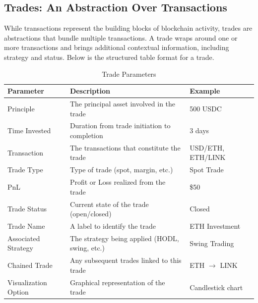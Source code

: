 \documentclass{article}
\begin{document}
\subsection{Trades: An Abstraction Over Transactions}
While transactions represent the building blocks of blockchain activity, trades are abstractions that bundle multiple transactions. A trade wraps around one or more transactions and brings additional contextual information, including strategy and status. Below is the structured table format for a trade.

\begin{table}[h!]
  \centering
  \begin{tabular}{|p{4cm}|p{8cm}|p{4cm}|}
  \hline
  \textbf{Parameter}        & \textbf{Description}                                & \textbf{Example}                     \\
  \hline
  Principle            & The principal asset involved in the trade      & 500 USDC                        \\
  \hline
  Time Invested        & Duration from trade initiation to completion   & 3 days                          \\
  \hline
  Transaction          & The transactions that constitute the trade     & USD/ETH, ETH/LINK               \\
  \hline
  Trade Type           & Type of trade (spot, margin, etc.)             & Spot Trade                      \\
  \hline
  PnL                  & Profit or Loss realized from the trade         & \$50                            \\
  \hline
  Trade Status         & Current state of the trade (open/closed)       & Closed                          \\
  \hline
  Trade Name           & A label to identify the trade                  & ETH Investment                  \\
  \hline
  Associated Strategy  & The strategy being applied (HODL, swing, etc.) & Swing Trading                   \\
  \hline
  Chained Trade        & Any subsequent trades linked to this trade     & ETH $\rightarrow$ LINK          \\
  \hline
  Visualization Option & Graphical representation of the trade          & Candlestick chart               \\
  \hline
  \end{tabular}
  \caption{Trade Parameters}
  \end{table}
  
\end{document}
